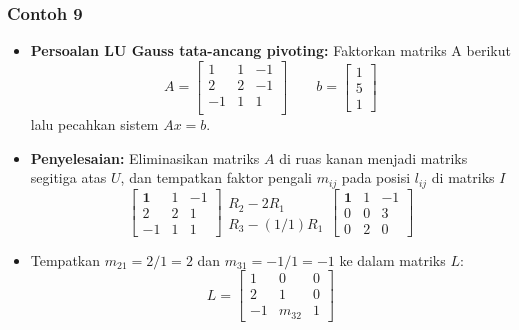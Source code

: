 \documentclass[pdflatex,compress,mathserif]{beamer}
\begin{document}
\begin{frame}
	\frametitle{Contoh 9}
	\begin{itemize}
		\item \textbf{Persoalan LU Gauss tata-ancang pivoting:} Faktorkan matriks A berikut
		\[ A = \begin{bmatrix}
		1 & 1 & -1 \\
		2 & 2 & -1 \\
		-1& 1 & 1 \\
		\end{bmatrix}
		\qquad
		b = \begin{bmatrix}
		1 \\ 5 \\ 1
		\end{bmatrix}
		\]
		lalu pecahkan sistem $ Ax = b $.
	\end{itemize}
\end{frame}

\begin{frame}
	\begin{itemize}
		\item \textbf{Penyelesaian:} Eliminasikan matriks $ A $ di ruas kanan menjadi matriks segitiga atas $ U $, dan tempatkan faktor pengali $ m_{ij} $ pada posisi $ l_{ij} $ di matriks $ I $
		\[ \begin{bmatrix}
			\textbf{1} & 1 & -1 \\
			2 & 2 & 1 \\
			-1 & 1 & 1
		\end{bmatrix}
		\begin{matrix}
		\\ R_2 - 2R_1 \\
		R_3 - (1/1)R_1
		\end{matrix}
		\begin{bmatrix}
		\textbf{1} & 1 & -1 \\
		0 & 0 & 3 \\
		0 & 2 & 0
		\end{bmatrix} \]
		\item Tempatkan $ m_{21} = 2/1 = 2 $ dan $ m_{31} = -1/1 = -1 $ ke dalam matriks $ L $:
		\[ L = \begin{bmatrix}
			1 & 0 & 0 \\
			2 & 1 & 0 \\
			-1 & m_{32} & 1
		\end{bmatrix} \]
	\end{itemize}
\end{frame}
\end{document}
